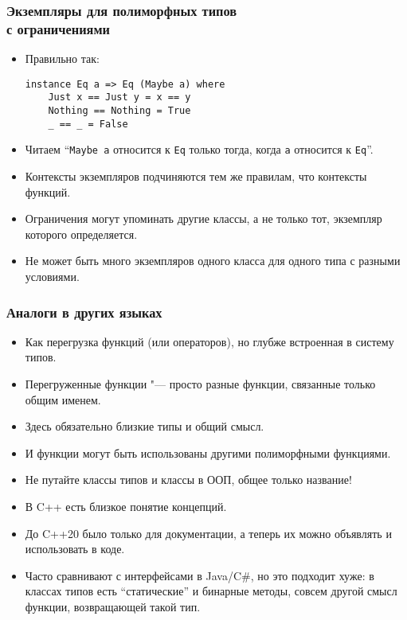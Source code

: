 \documentclass[10pt]{beamer}
\begin{document}
\begin{frame}[fragile]
\frametitle{Экземпляры для полиморфных типов \\с ограничениями}
\begin{itemize}
    \item Правильно так:
\begin{lstlisting}
instance Eq a => Eq (Maybe a) where
    Just x == Just y = x == y
    Nothing == Nothing = True
    _ == _ = False
\end{lstlisting} 
    \item Читаем \enquote{\lstinline|Maybe a| относится к \lstinline|Eq| только тогда, когда \lstinline|a| относится к \lstinline|Eq|}.
    \item Контексты экземпляров подчиняются тем же правилам, что контексты функций.
    \item Ограничения могут упоминать другие классы, а не только тот, экземпляр которого определяется.
    \item Не может быть много экземпляров одного класса для одного типа с разными условиями.
\end{itemize}
\end{frame}

\begin{frame}[fragile]
\frametitle{Аналоги в других языках}
\begin{itemize}
    \item Как перегрузка функций (или операторов), но глубже встроенная в систему типов.
    \item Перегруженные функции "--- просто разные функции, связанные только общим именем.
    \item Здесь обязательно близкие типы и общий смысл.
    \item И функции могут быть использованы другими полиморфными функциями. \pause
    \item Не путайте классы типов и классы в ООП, общее только название!
    \item В C++ есть близкое понятие концепций. \pause
    \item До C++20 было только для документации, а теперь их можно объявлять и использовать в коде. \pause
    \item Часто сравнивают с интерфейсами в Java/C\#, но это подходит хуже: \pause в классах типов есть \enquote{статические} и бинарные методы, совсем другой смысл функции, возвращающей такой тип.
\end{itemize}
\end{frame}
\end{document}
